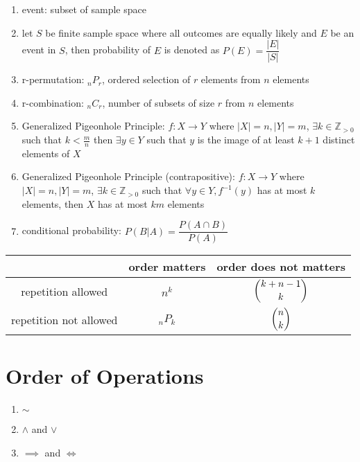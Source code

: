 \documentclass[landscape, a4paper]{article}
\newcommand{\Z}{\mathbb{Z}}
\newcommand{\Or}{\vee}
\renewcommand{\and}{\wedge}
\newcommand{\customsection}[1]{
    \vspace*{-16pt}
    \section*{#1}
    \vspace*{-4pt}
}
\newenvironment{wenumerate}{\begin{enumerate}[wide, labelindent=2pt]}{\end{enumerate}}
\begin{document}
\begin{multicols*}{4}
\begin{wenumerate}
        \item event: subset of sample space
        \item let $S$ be finite sample space where all outcomes are equally likely and $E$ be an event in $S$, then probability of $E$ is denoted as $P(E)=\dfrac{|E|}{|S|}$
        \item r-permutation: $_nP_r$, ordered selection of $r$ elements from $n$ elements
        \item r-combination: $_nC_r$, number of subsets of size $r$ from $n$ elements
        \item Generalized Pigeonhole Principle: $f:X\rightarrow Y$ where $|X|=n, |Y|=m$, $\exists k\in\Z_{>0}$ such that $k<\frac{m}{n}$ then $\exists y\in Y$ such that $y$ is the image of at least $k+1$ distinct elements of $X$
        \item Generalized Pigeonhole Principle (contrapositive): $f:X\rightarrow Y$ where $|X|=n, |Y|=m$, $\exists k\in\Z_{>0}$ such that $\forall y\in Y, f^{-1}({y})$ has at most $k$ elements, then $X$ has at most $km$ elements
        \item conditional probability: $P(B|A)=\dfrac{P(A\cap B)}{P(A)}$
    \end{wenumerate}
    \begin{tabularx}{\columnwidth}{|C|C|C|}
        \hline
                               & order matters & order does not matters \\
        \hline
        repetition allowed     & $n^k$         & $\dbinom{k+n-1}{k}$    \\
        \hline
        repetition not allowed & $_nP_k$       & $\dbinom{n}{k}$        \\
        \hline
    \end{tabularx}
    \customsection{Order of Operations}
    \begin{wenumerate}
        \item ${\sim}$
        \item $\and$ and $\Or$
        \item $\implies$ and $\iff$
    \end{wenumerate}


\end{multicols*}
\end{document}
